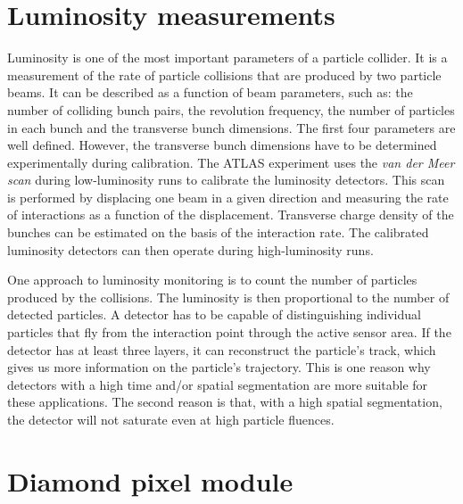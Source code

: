 \documentclass[12pt]{packages/mytustyle}  %
\begin{document}
\section{Luminosity measurements}
\label{sec:lummeas}
 \label{sec:lumi}
Luminosity is one of the most important parameters of a particle collider. It is a measurement of the rate of particle collisions that are produced by two particle beams. It can be described as a function of beam parameters, such as: the number of colliding bunch pairs, the revolution frequency, the number of particles in each bunch and the transverse bunch dimensions. The first four parameters are well defined. However, the transverse bunch dimensions have to be determined experimentally during calibration. The ATLAS experiment uses the \emph{van der Meer scan} \cite{} during low-luminosity runs to calibrate the luminosity detectors. This scan is performed by displacing one beam in a given direction and measuring the rate of interactions as a function of the displacement. Transverse charge density of the bunches can be estimated on the basis of the interaction rate. The calibrated luminosity detectors can then operate during high-luminosity runs.

One approach to luminosity monitoring is to count the number of particles produced by the collisions. The luminosity is then proportional to the number of detected particles. A detector has to be capable of distinguishing individual particles that fly from the interaction point through the active sensor area. If the detector has at least three layers, it can reconstruct the particle's track, which gives us more information on the particle's trajectory. This is one reason why detectors with a high time and/or spatial segmentation are more suitable for these applications. The second reason is that, with a high spatial segmentation, the detector will not saturate even at high particle fluences.





\section{Diamond pixel module}
\label{sec:atlasdbm}
\end{document}
